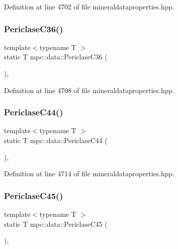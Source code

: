 Definition at line 4702 of file mineraldataproperties.\+hpp.

\mbox{\label{namespacempc_1_1data_a9941f65dac1adf95b216f6c74fc03b30}} 
\subsubsection{\texorpdfstring{Periclase\+C36()}{PericlaseC36()}}
{\footnotesize\ttfamily template$<$typename T $>$ \\
static T mpc\+::data\+::\+Periclase\+C36 (\begin{DoxyParamCaption}{ }\end{DoxyParamCaption})\hspace{0.3cm}{\ttfamily [inline]}, {\ttfamily [static]}}



Definition at line 4708 of file mineraldataproperties.\+hpp.

\mbox{\label{namespacempc_1_1data_a1db1279859f4f4b70a69b3960940c8d5}} 
\subsubsection{\texorpdfstring{Periclase\+C44()}{PericlaseC44()}}
{\footnotesize\ttfamily template$<$typename T $>$ \\
static T mpc\+::data\+::\+Periclase\+C44 (\begin{DoxyParamCaption}{ }\end{DoxyParamCaption})\hspace{0.3cm}{\ttfamily [inline]}, {\ttfamily [static]}}



Definition at line 4714 of file mineraldataproperties.\+hpp.

\mbox{\label{namespacempc_1_1data_ab677a9c32f42231c09e9aff423b5f6ae}} 
\subsubsection{\texorpdfstring{Periclase\+C45()}{PericlaseC45()}}
{\footnotesize\ttfamily template$<$typename T $>$ \\
static T mpc\+::data\+::\+Periclase\+C45 (\begin{DoxyParamCaption}{ }\end{DoxyParamCaption})\hspace{0.3cm}{\ttfamily [inline]}, {\ttfamily [static]}}



